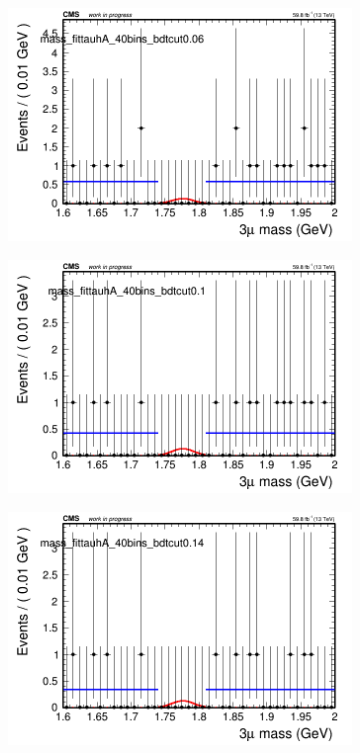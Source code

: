 \begin{figure}[H]
\begin{subfigure}{0.2\textwidth}
        \caption{}
    \end{subfigure}
    \begin{subfigure}{0.2\textwidth}
        \includegraphics[width=\textwidth]{flat_fit/plots/tauhA/massfit_tauhA_40bins_bdtcut0.06.png}
        \caption{}
    \end{subfigure}
    \begin{subfigure}{0.2\textwidth}
        \includegraphics[width=\textwidth]{flat_fit/plots/tauhA/massfit_tauhA_40bins_bdtcut0.1.png}
        \caption{}
    \end{subfigure}
    \begin{subfigure}{0.2\textwidth}
        \includegraphics[width=\textwidth]{flat_fit/plots/tauhA/massfit_tauhA_40bins_bdtcut0.14.png}

\end{subfigure}
\end{figure}
